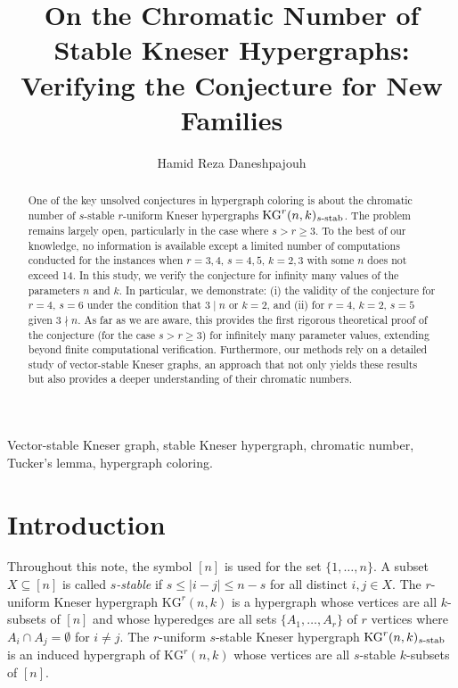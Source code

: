 \documentclass[preprint,12pt,3p]{elsarticle}
\begin{document}
\begin{frontmatter}

\title{On the Chromatic Number of Stable Kneser Hypergraphs: Verifying the Conjecture for New Families}

\author[1]{Hamid Reza Daneshpajouh}

\address[1]{School of Mathematical Sciences, University of Nottingham Ningbo China, 199 Taikang East Road, Ningbo, 315100, China}


\begin{abstract}
One of the key unsolved conjectures in hypergraph coloring is about the chromatic number of $s$-stable $r$-uniform Kneser hypergraphs $\mathrm{KG}^r(n,k)_{s\textup{-stab}}$. The problem remains largely open, particularly in the case where $s > r\geq 3$. To the best of our knowledge, no information is available except a limited number of computations conducted for the instances when $r=3, 4$, $s=4, 5$, $k=2,3$ with some $n$ does not exceed 14. In this study, we verify the conjecture for infinity many values of the parameters $n$ and $k$. In particular, we demonstrate: (i) the validity of the conjecture for $r = 4$, $s = 6$ under the condition that $3 \mid n$ or $k=2$, and (ii) for $r = 4$, $k = 2$, $s = 5$ given $3 \nmid n$. As far as we are aware, this provides the first rigorous theoretical proof of the conjecture (for the case $s > r\geq 3$) for infinitely many parameter values, extending beyond finite computational verification. Furthermore, our methods rely on a detailed study of vector-stable Kneser graphs, an approach that not only yields these results but also provides a deeper understanding of their chromatic numbers.
\end{abstract}

\begin{keyword}
Vector-stable Kneser graph, stable Kneser hypergraph, chromatic number, Tucker's lemma, hypergraph coloring.
\end{keyword}

\end{frontmatter}

\section{Introduction}

Throughout this note, the symbol $[n]$ is used for the set $\{1,\ldots, n\}$. A subset $X \subseteq [n]$ is called \textit{$s$-stable} if $s\leq |i-j|\leq n-s$ for all distinct $i, j\in X$. The $r$-uniform Kneser hypergraph $\mathrm{KG}^{r}(n,k)$ is a hypergraph whose vertices are all $k$-subsets of $[n]$ and whose hyperedges are all sets $\{A_1, \ldots , A_r\}$ of $r$ vertices where $A_i\cap A_j=\emptyset$ for $i\neq j$. The $r$-uniform $s$-stable Kneser hypergraph $\mathrm{KG}^{r}(n,k)_{s\textup{-stab}}$ is an induced hypergraph of $\mathrm{KG}^{r}(n,k)$ whose vertices are all $s$-stable $k$-subsets of $[n]$. 
\end{document}
